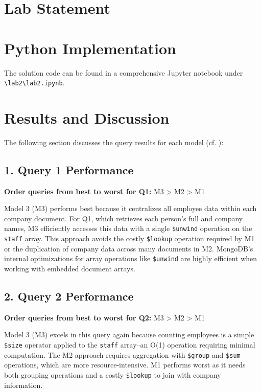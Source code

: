 \section{Lab Statement}

\section{Python Implementation}

The solution code can be found in a comprehensive Jupyter notebook under \verb|\lab2\lab2.ipynb|.


\section{Results and Discussion}

The following section discusses the query results for each model (cf. ):



\subsection*{1. Query 1 Performance}
\textbf{Order queries from best to worst for Q1:} M3 > M2 > M1

Model 3 (M3) performs best because it centralizes all employee data within each company document. For Q1, which retrieves each person's full and company names, M3 efficiently accesses this data with a single \texttt{\$unwind} operation on the \texttt{staff} array. This approach avoids the costly \texttt{\$lookup} operation required by M1 or the duplication of company data across many documents in M2. MongoDB's internal optimizations for array operations like \texttt{\$unwind} are highly efficient when working with embedded document arrays.

\subsection*{2. Query 2 Performance}
\textbf{Order queries from best to worst for Q2:} M3 > M2 > M1

Model 3 (M3) excels in this query again because counting employees is a simple \texttt{\$size} operator applied to the \texttt{staff} array--an O(1) operation requiring minimal computation. The M2 approach requires aggregation with \texttt{\$group} and \texttt{\$sum} operations, which are more resource-intensive. M1 performs worst as it needs both grouping operations and a costly \texttt{\$lookup} to join with company information.


